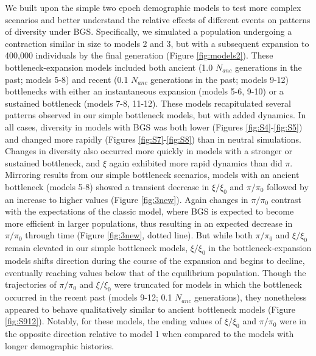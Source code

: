 \documentclass[9pt,twocolumn,twoside]{rilabRxiv}
\begin{document}
We built upon the simple two epoch demographic models to test more complex scenarios and better understand the relative effects of different events on patterns of diversity under BGS.
Specifically, we simulated a population undergoing a contraction similar in size to models 2 and 3, but with a subsequent expansion to 400,000 individuals by the final generation (Figure \ref{fig:models2}).
These bottleneck-expansion models included both ancient (1.0 $N_{anc}$ generations in the past; models 5-8) and recent (0.1 $N_{anc}$ generations in the past; models 9-12) bottlenecks with either an instantaneous expansion (models 5-6, 9-10) or a sustained bottleneck (models 7-8, 11-12).
These models recapitulated several patterns observed in our simple bottleneck models, but with added dynamics.
In all cases, diversity  in models with BGS was both lower (Figures \ref{fig:S4}-\ref{fig:S5}) and changed more rapidly (Figures \ref{fig:S7}-\ref{fig:S8}) than in neutral simulations.
Changes in diversity also occurred more quickly in models with a stronger or sustained bottleneck, and  $\xi$ again exhibited more rapid dynamics than did $\pi$.
Mirroring results from our simple bottleneck scenarios, models with an ancient bottleneck (models 5-8) showed a transient decrease in $\xi/\xi_0$ and $\pi/\pi_0$ followed by an increase to higher values (Figure \ref{fig:3new}).
Again changes in $\pi/\pi_0$ contrast with the expectations of the classic model, where  BGS is expected to become more efficient in larger populations, thus resulting in an expected decrease in $\pi/\pi_0$ through time (Figure \ref{fig:3new}, dotted line).
But while both $\pi/\pi_0$ and $\xi/\xi_0$ remain elevated in our simple bottleneck models, $\xi/\xi_0$ in the bottleneck-expansion models shifts direction during the course of the expansion and begins to decline, eventually reaching values below that of the equilibrium population.
Though the trajectories of $\pi/\pi_0$ and $\xi/\xi_0$ were truncated for models in which the bottleneck occurred in the recent  past (models 9-12; 0.1 $N_{anc}$ generations), they nonetheless appeared to behave qualitatively similar to ancient bottleneck models (Figure \ref{fig:S912}). Notably, for these models, the ending values of $\xi/\xi_0$ and $\pi/\pi_0$ were in the opposite direction relative to model 1 when compared to the models with longer demographic histories.
\end{document}
